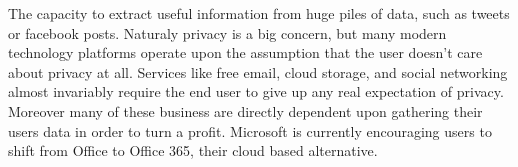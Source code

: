 The capacity to extract useful information from huge piles of data, such as tweets or facebook posts.\autocite[]{NextGenBusinessSoftware}
Naturaly privacy is a big concern, but many modern technology platforms operate upon the assumption that the user doesn't care about privacy at all. Services like free email, cloud storage, and social networking almost invariably require the end user to give up any real expectation of privacy. Moreover many of these business are directly dependent upon gathering their users data in order to turn a profit.\autocite[]{NextGenBusinessSoftware}
Microsoft is currently encouraging users to shift from Office  to Office 365, their cloud based alternative.\autocite[]{NextGenBusinessSoftware}
